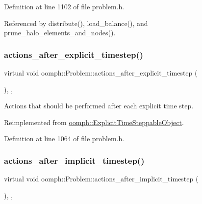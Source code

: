 Definition at line 1102 of file problem.\+h.



Referenced by distribute(), load\+\_\+balance(), and prune\+\_\+halo\+\_\+elements\+\_\+and\+\_\+nodes().

\mbox{\label{classoomph_1_1Problem_a51bfd872c45467a65ce977f3753a6d1d}} 
\subsubsection{\texorpdfstring{actions\+\_\+after\+\_\+explicit\+\_\+timestep()}{actions\_after\_explicit\_timestep()}}
{\footnotesize\ttfamily virtual void oomph\+::\+Problem\+::actions\+\_\+after\+\_\+explicit\+\_\+timestep (\begin{DoxyParamCaption}{ }\end{DoxyParamCaption})\hspace{0.3cm}{\ttfamily [inline]}, {\ttfamily [protected]}, {\ttfamily [virtual]}}



Actions that should be performed after each explicit time step. 



Reimplemented from \hyperlink{classoomph_1_1ExplicitTimeSteppableObject_a22371b17397f74660c8e9d54ed50ccea}{oomph\+::\+Explicit\+Time\+Steppable\+Object}.



Definition at line 1064 of file problem.\+h.

\mbox{\label{classoomph_1_1Problem_a012692496c968960f4ea27db4e89cc7d}} 
\subsubsection{\texorpdfstring{actions\+\_\+after\+\_\+implicit\+\_\+timestep()}{actions\_after\_implicit\_timestep()}}
{\footnotesize\ttfamily virtual void oomph\+::\+Problem\+::actions\+\_\+after\+\_\+implicit\+\_\+timestep (\begin{DoxyParamCaption}{ }\end{DoxyParamCaption})\hspace{0.3cm}{\ttfamily [inline]}, {\ttfamily [protected]}, {\ttfamily [virtual]}}



